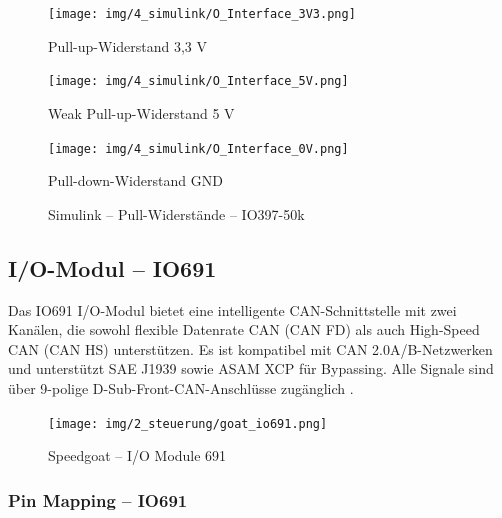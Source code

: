 \pagebreak[1]
\begin{figure}
	\begin{minipage}{0.8\textwidth}
		\centering
		\texttt{[image: img/4\_simulink/O\_Interface\_3V3.png]}
		\caption*{Pull-up-Widerstand 3,3 V}
	\end{minipage}
	\begin{minipage}{0.8\textwidth}
		\centering
		\texttt{[image: img/4\_simulink/O\_Interface\_5V.png]}
		\caption*{Weak Pull-up-Widerstand 5 V}
	\end{minipage}
	\begin{minipage}{0.8\textwidth}
		\centering
		\texttt{[image: img/4\_simulink/O\_Interface\_0V.png]}
		\caption*{Pull-down-Widerstand GND}
	\end{minipage}
	\caption{Simulink – Pull-Widerstände – IO397-50k \cite[12]{speedgoat:IO397_50k}}
	\label{IO397_50k_Konfigurieren:img:Pull_Widerstande}
\end{figure}
\pagebreak[4]

\newpage
\subsection{I/O-Modul – IO691}
\label{section:IO691}

Das IO691 I/O-Modul bietet eine intelligente CAN-Schnittstelle mit zwei Kanälen, die sowohl flexible Datenrate CAN (CAN FD) als auch High-Speed CAN (CAN HS) unterstützen. Es ist kompatibel mit CAN 2.0A/B-Netzwerken und unterstützt SAE J1939 sowie ASAM XCP für Bypassing. Alle Signale sind über 9-polige D-Sub-Front-CAN-Anschlüsse zugänglich \cite[4]{speedgoat:IO691}.

\pagebreak[1]
\begin{figure}[!ht]
	\begin{center}
		\texttt{[image: img/2\_steuerung/goat\_io691.png]}
		\caption{Speedgoat – I/O Module 691 \cite{speedgoat:IO691}}
		\label{img_2_2:goat:IO691}
	\end{center}
\end{figure}
\pagebreak[4]




\subsubsection{Pin Mapping –  IO691}

